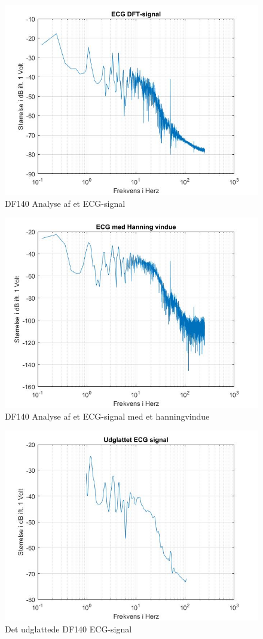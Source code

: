 \begin{figure}[H]
	\centering
	\includegraphics[width=140mm]{figures/ECG/DFT.jpg}
	\caption{DF140 Analyse af et ECG-signal}
	\label{fig:ECG DF140}
\end{figure}

\begin{figure}[H]
	\centering
	\includegraphics[width=140mm]{figures/ECG/hanning.jpg}
	\caption{DF140 Analyse af et ECG-signal med et hanningvindue}
	\label{fig:ECG hanning}
\end{figure}

\begin{figure}[H]
	\centering
	\includegraphics[width=140mm]{figures/ECG/udglattet.jpg}
	\caption{Det udglattede DF140 ECG-signal}
	\label{fig:ECG udglattet}
\end{figure}

